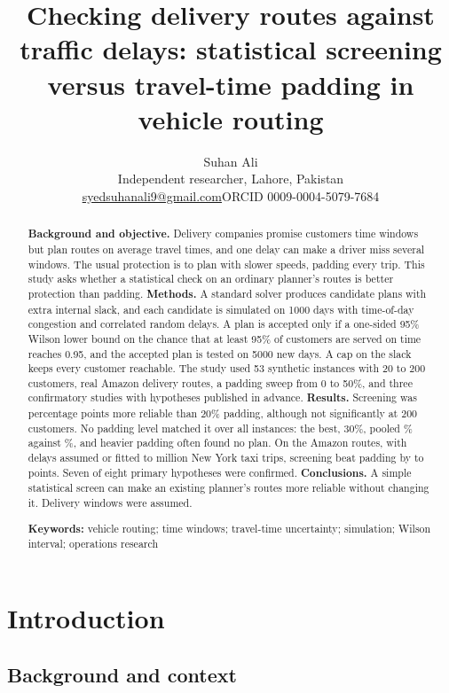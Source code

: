 \documentclass[12pt,letterpaper]{article}
\title{Checking delivery routes against traffic delays: statistical screening
versus travel-time padding in vehicle routing}
\author{}
\author{Suhan Ali\\[2pt]
\small Independent researcher, Lahore, Pakistan\\
\small \href{mailto:syedsuhanali9@gmail.com}{syedsuhanali9@gmail.com}\quad ORCID 0009-0004-5079-7684}
\date{}
\begin{document}
\maketitle

\begin{abstract}
\noindent\textbf{Background and objective.} Delivery companies promise customers
time windows but plan routes on average travel times, and one delay can make a
driver miss several windows. The usual protection is to
plan with slower speeds, padding every trip. This study asks whether a statistical
check on an ordinary planner's routes is better protection than padding. \textbf{Methods.} A standard solver produces candidate
plans with extra internal slack, and each candidate is simulated on 1000
days with time-of-day congestion and correlated random delays. A plan is accepted
only if a one-sided 95\% Wilson lower bound on the chance that at least 95\% of
customers are served on time reaches 0.95, and the accepted plan is tested
on 5000 new days. A cap on the slack keeps every customer reachable. The study
used 53 synthetic instances with 20 to 200 customers, \AmzRoutes{} real Amazon
delivery routes, a padding sweep from 0 to 50\%, and three confirmatory studies
with hypotheses published in advance. \textbf{Results.} Screening was \ProcConsRange{} percentage points more
reliable than 20\% padding, although not significantly at 200 customers. No padding
level matched it over all instances: the best, 30\%, pooled \PadThirtyPooled\%
against \PadCapPooled\%, and heavier padding often found no plan. On the Amazon routes, with delays assumed or
fitted to \NycTripsM{} million New York taxi trips, screening beat padding by
\AmzCapDiffMin{} to \AmzCapDiffMax{} points. Seven of
eight primary hypotheses were confirmed. \textbf{Conclusions.} A
simple statistical screen can make an existing planner's routes more reliable without changing it. Delivery windows were assumed.

\medskip\noindent\textbf{Keywords:} vehicle routing; time windows; travel-time
uncertainty; simulation; Wilson interval; operations research
\end{abstract}

\section{Introduction}

\subsection{Background and context}
\end{document}
